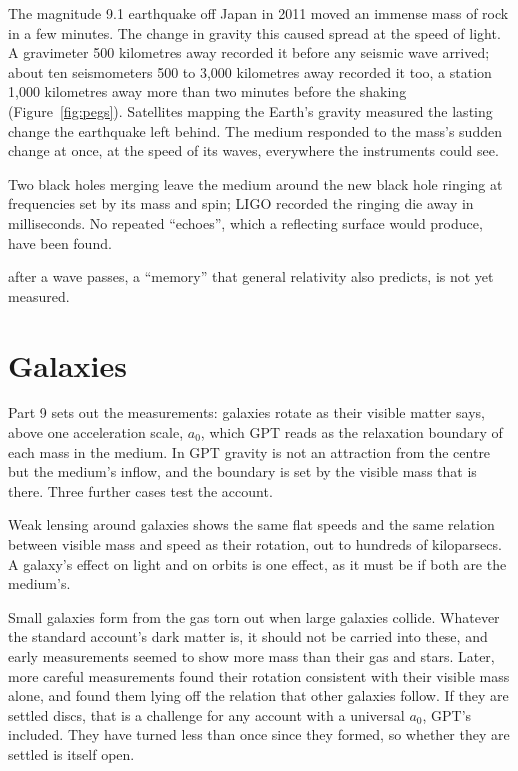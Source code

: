  The magnitude 9.1 earthquake off Japan in 2011 moved an immense mass of rock in a few minutes. The change in gravity this caused spread at the speed of light. A gravimeter 500 kilometres away recorded it before any seismic wave arrived; about ten seismometers 500 to 3,000 kilometres away recorded it too, a station 1,000 kilometres away more than two minutes before the shaking (Figure~\ref{fig:pegs}). Satellites mapping the Earth's gravity measured the lasting change the earthquake left behind. The medium responded to the mass's sudden change at once, at the speed of its waves, everywhere the instruments could see.

 Two black holes merging leave the medium around the new black hole ringing at frequencies set by its mass and spin; LIGO recorded the ringing die away in milliseconds. No repeated ``echoes'', which a reflecting surface would produce, have been found.

 after a wave passes, a ``memory'' that general relativity also predicts, is not yet measured.

\section{Galaxies}

Part 9 sets out the measurements: galaxies rotate as their visible matter says, above one acceleration scale, $a_0$, which GPT reads as the relaxation boundary of each mass in the medium. In GPT gravity is not an attraction from the centre but the medium's inflow, and the boundary is set by the visible mass that is there. Three further cases test the account.

 Weak lensing around galaxies shows the same flat speeds and the same relation between visible mass and speed as their rotation, out to hundreds of kiloparsecs. A galaxy's effect on light and on orbits is one effect, as it must be if both are the medium's.

 Small galaxies form from the gas torn out when large galaxies collide. Whatever the standard account's dark matter is, it should not be carried into these, and early measurements seemed to show more mass than their gas and stars. Later, more careful measurements found their rotation consistent with their visible mass alone, and found them lying off the relation that other galaxies follow. If they are settled discs, that is a challenge for any account with a universal $a_0$, GPT's included. They have turned less than once since they formed, so whether they are settled is itself open.

